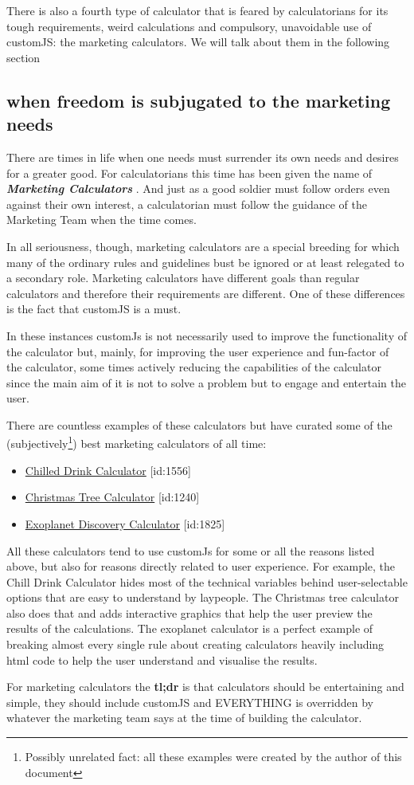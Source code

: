 There is also a fourth type of calculator that is feared by calculatorians for its tough requirements, weird calculations and compulsory, unavoidable use of customJS: the marketing calculators. We will talk about them in the following section

\subsection{when freedom is subjugated to the marketing needs}
\label{sub:marketing}
There are times in life when one needs must surrender its own needs and desires for a greater good. For calculatorians this time has been given the name of \textbf{\textit{Marketing Calculators}} . And just as a good soldier must follow orders even against their own interest, a calculatorian must follow the guidance of the Marketing Team when the time comes. 

In all seriousness, though, marketing calculators are a special breeding for which many of the ordinary rules and guidelines bust be ignored or at least relegated to a secondary role. Marketing calculators have different goals than regular calculators and therefore their requirements are different. One of these differences is the fact that customJS is a must. 

In these instances customJs is not necessarily used to improve the functionality of the calculator but, mainly, for improving the user experience and fun-factor of the calculator, some times actively reducing the capabilities of the calculator since the main aim of it is not to solve a problem but to engage and entertain the user. 

There are countless examples of these calculators but have curated some of the (subjectively\footnote{Possibly unrelated fact: all these examples were created by the author of this document}) best marketing calculators of all time:
\begin{itemize}
    \item \href{https://www.omnicalculator.com/all/chilled-drink}{Chilled Drink Calculator} [id:1556]
    \item \href{https://www.omnicalculator.com/all/christmas-tree}{Christmas Tree Calculator} [id:1240]
    \item \href{https://www.omnicalculator.com/all/exoplanet}{Exoplanet Discovery Calculator} [id:1825]
\end{itemize}

All these calculators tend to use customJs for some or all the reasons listed above, but also for reasons directly related to user experience. For example, the Chill Drink Calculator hides most of the technical variables behind user-selectable options that are easy to understand by laypeople. The Christmas tree calculator also does that and adds interactive graphics that help the user preview the results of the calculations. The exoplanet calculator is a perfect example of breaking almost every single rule about creating calculators heavily including html code to help the user understand and visualise the results.

    For marketing calculators the \textbf{tl;dr} is that calculators should be entertaining and simple, they should include customJS and EVERYTHING is overridden by whatever the marketing team says at the time of building the calculator.

    
